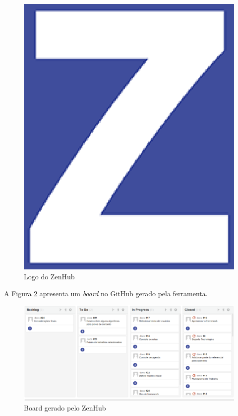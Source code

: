 \begin{figure}[!h]
	\centering
	\includegraphics[scale=0.3]{figuras/capitulo3/logo_zenhub.eps}
	\caption{Logo do ZenHub}
	\label{logo_zenhub}
\end{figure}

A Figura \ref{zenhub} apresenta um \textit{board} no GitHub gerado pela ferramenta.

\begin{figure}[!h]
	\centering
	\includegraphics[scale=0.3]{figuras/capitulo3/zenhub.eps}
	\caption{Board gerado pelo ZenHub}
	\label{zenhub}
\end{figure}

